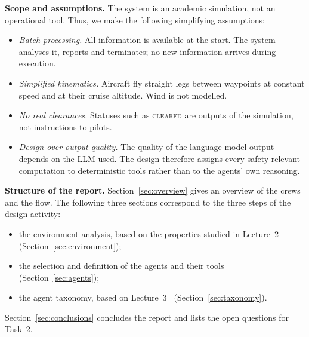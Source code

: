 \textbf{Scope and assumptions.} The system is an academic simulation, not an operational tool. Thus, we make the following simplifying assumptions:
\begin{itemize}
    \item \emph{Batch processing.} All information is available at the start. The system analyses it, reports and terminates; no new information arrives during execution.
    \item \emph{Simplified kinematics.} Aircraft fly straight legs between waypoints at constant speed and at their cruise altitude. Wind is not modelled.
    \item \emph{No real clearances.} Statuses such as \textsc{cleared} are outputs of the simulation, not instructions to pilots.
    \item \emph{Design over output quality.} The quality of the language-model output depends on the LLM used. The design therefore assigns every safety-relevant computation to deterministic tools rather than to the agents' own reasoning.
\end{itemize}

\textbf{Structure of the report.} Section~\ref{sec:overview} gives an overview of the crews and the flow. The following three sections correspond to the three steps of the design activity:
\begin{itemize}
    \item the environment analysis, based on the properties studied in Lecture~2~\cite{urvlect2} (Section~\ref{sec:environment});
    \item the selection and definition of the agents and their tools (Section~\ref{sec:agents});
    \item the agent taxonomy, based on Lecture~3~\cite{urvlect3} (Section~\ref{sec:taxonomy}).
\end{itemize}
Section~\ref{sec:conclusions} concludes the report and lists the open questions for Task~2.

